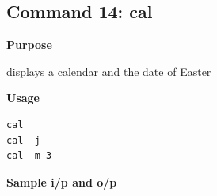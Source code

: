\documentclass{article}
\begin{document}
\subsection{Command 14: cal} 
\textbf{Purpose}
\begin{flushleft}
 displays a calendar and the date of Easter
\end{flushleft}
\textbf{Usage}
\begin{verbatim}
cal
cal -j
cal -m 3
\end{verbatim}
\textbf{Sample i/p and o/p}
\begin{figure}[H] 
\end{figure}
\end{document}
